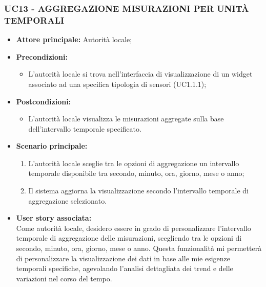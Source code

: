 \subsubsection{UC13 - AGGREGAZIONE MISURAZIONI PER UNITÀ TEMPORALI}
\begin{itemize}
    \item \textbf{Attore principale:} Autorità locale;
    \item \textbf{Precondizioni:}
            \begin{itemize}
                \item L'autorità locale si trova nell'interfaccia di visualizzazione di un widget associato ad una specifica tipologia di sensori (UC1.1.1); 
            \end{itemize}
    \item \textbf{Postcondizioni:}
          \begin{itemize}
              \item L'autorità locale visualizza le misurazioni aggregate sulla base dell'intervallo temporale specificato.
          \end{itemize}
    \item \textbf{Scenario principale:}
          \begin{enumerate}
             \item L'autorità locale sceglie tra le opzioni di aggregazione un intervallo temporale disponibile tra secondo, minuto, ora, giorno, mese o anno;
             \item Il sistema aggiorna la visualizzazione secondo l'intervallo temporale di aggregazione selezionato.
          \end{enumerate}
    \item \textbf{User story associata:} \\
        Come autorità locale, desidero essere in grado di personalizzare l'intervallo temporale di aggregazione delle misurazioni, scegliendo tra le opzioni di secondo, minuto, ora, giorno, mese o anno. Questa funzionalità mi permetterà di personalizzare la visualizzazione dei dati in base alle mie esigenze temporali specifiche, agevolando l'analisi dettagliata dei trend e delle variazioni nel corso del tempo.
\end{itemize}